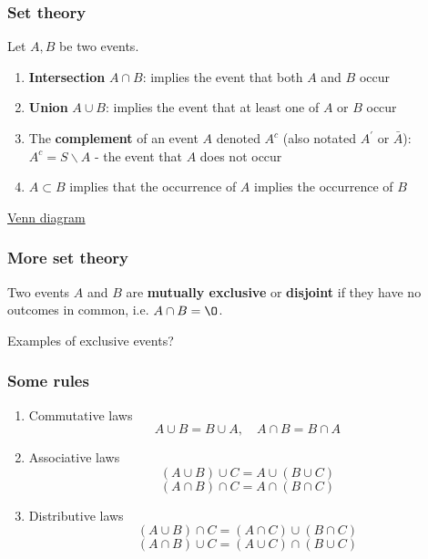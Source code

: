 \documentclass[slidestop,compress,mathserif]{beamer}
\begin{document}
\begin{frame}
\frametitle{Set theory}

Let $A, B$ be two events.

\begin{defn}

\begin{enumerate}
\item \textbf{Intersection} $A \cap B$:  implies the event that both $A$ and $B$ occur
\item \textbf{Union} $A \cup B$: implies the event that at least one of $A$ or $B$ occur
\item The {\bf complement} of an event $A$ denoted $A^c$ (also notated $A^{\prime}$ or $\bar{A}$):
$A^c = S \backslash A$ - the event that $A$ does not occur
\item $A \subset B$ implies that the occurrence of $A$ implies the occurrence of $B$
\end{enumerate}
\end{defn}

\underline{Venn diagram}

\end{frame}


\begin{frame}\frametitle{More set theory}

\begin{defn}
Two events $A$ and $B$ are {\bf mutually exclusive} or {\bf disjoint}
if they have no outcomes in common, i.e. $A\cap B=\O$.
\end{defn}

\vspace{.1in}
\pause
Examples of exclusive events?\\



\end{frame}



\begin{frame}\frametitle{Some rules}

\begin{enumerate}

\item Commutative laws
\[ A \cup B = B \cup A, \quad A \cap B = B \cap A \]
\pause

\item Associative laws
\[(A \cup B) \cup C = A \cup (B \cup C) \]
\[(A \cap B) \cap C = A \cap (B \cap C)\]
\pause

\item Distributive laws
\[(A \cup B) \cap C = (A \cap C) \cup (B \cap C)\]
\[(A \cap B) \cup C = (A \cup C) \cap (B \cup C)\]

\end{enumerate}




\end{frame}
\end{document}
